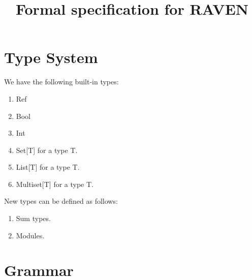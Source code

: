 \documentclass{article}
\begin{document}
	\title{Formal specification for RAVEN}
	\date{}
	
	\maketitle

	\section{Type System}
	We have the following built-in types:
	\begin{enumerate}
		\item Ref
		\item Bool
		\item Int
		\item Set[T] for a type T.
		\item List[T] for a type T.
		\item Multiset[T] for a type T.
	\end{enumerate}

	\noindent New types can be defined as follows:
	\begin{enumerate}
		\item Sum types.
		\item Modules.
	\end{enumerate}
	
	
	\section{Grammar}
\end{document}
